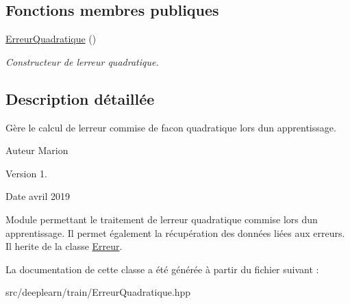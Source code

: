 \subsection*{Fonctions membres publiques}
\begin{DoxyCompactItemize}
\item 
\mbox{\label{classErreurQuadratique_aa11b896dc5e7ed5427568ee2c0bc1b1a}} 
\hyperlink{classErreurQuadratique_aa11b896dc5e7ed5427568ee2c0bc1b1a}{Erreur\+Quadratique} ()
\begin{DoxyCompactList}\small\item\em Constructeur de l\textquotesingle{}erreur quadratique. \end{DoxyCompactList}\end{DoxyCompactItemize}


\subsection{Description détaillée}
Gère le calcul de l\textquotesingle{}erreur commise de facon quadratique lors d\textquotesingle{}un apprentissage. 

\begin{DoxyAuthor}{Auteur}
Marion 
\end{DoxyAuthor}
\begin{DoxyVersion}{Version}
1. 
\end{DoxyVersion}
\begin{DoxyDate}{Date}
avril 2019
\end{DoxyDate}
Module permettant le traitement de l\textquotesingle{}erreur quadratique commise lors d\textquotesingle{}un apprentissage. Il permet également la récupération des données liées aux erreurs. Il herite de la classe \hyperlink{classErreur}{Erreur}. 

La documentation de cette classe a été générée à partir du fichier suivant \+:\begin{DoxyCompactItemize}
\item 
src/deeplearn/train/Erreur\+Quadratique.\+hpp\end{DoxyCompactItemize}

